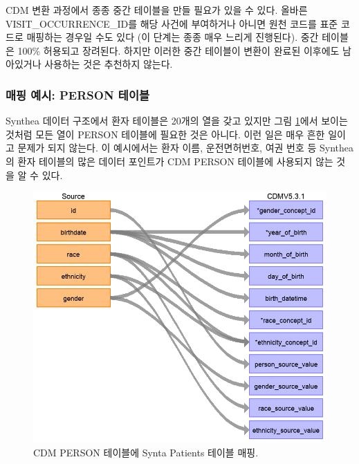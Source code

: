 \documentclass[10.5pt]{book}
\theoremstyle{definition}
\theoremstyle{definition}
\theoremstyle{definition}
\theoremstyle{remark}
\begin{document}
CDM 변환 과정에서 종종 중간 테이블을 만들 필요가 있을 수 있다. 올바른
VISIT\_OCCURRENCE\_ID를 해당 사건에 부여하거나 아니면 원천 코드를 표준
코드로 매핑하는 경우일 수도 있다 (이 단계는 종종 매우 느리게 진행된다).
중간 테이블은 100\% 허용되고 장려된다. 하지만 이러한 중간 테이블이
변환이 완료된 이후에도 남아있거나 사용하는 것은 추천하지 않는다.

\subsubsection*{매핑 예시: PERSON 테이블}\label{--person-}

Synthea 데이터 구조에서 환자 테이블은 20개의 열을 갖고 있지만 그림
\ref{fig:syntheaPerson}에서 보이는 것처럼 모든 열이 PERSON 테이블에
필요한 것은 아니다. 이런 일은 매우 흔한 일이고 문제가 되지 않는다. 이
예시에서는 환자 이름, 운전면허번호, 여권 번호 등 Synthea의 환자 테이블의
많은 데이터 포인트가 CDM PERSON 테이블에 사용되지 않는 것을 알 수 있다.

\begin{figure}

{\centering \includegraphics[width=1\linewidth]{images/ExtractTransformLoad/syntheaPersonTable} 

}

\caption{CDM PERSON 테이블에 Synta Patients 테이블 매핑.}\label{fig:syntheaPerson}
\end{figure}
\end{document}
